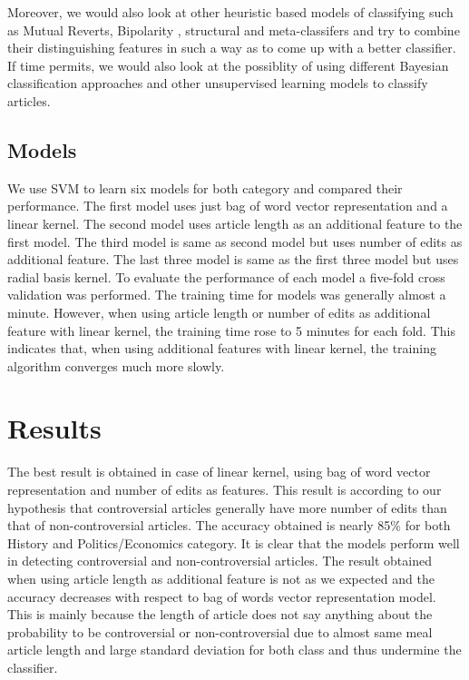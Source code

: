\documentclass[twocolumn]{article}
\newcommand{\comment}[1]{}
\begin{document}
  Moreover, we would also look at other heuristic based
models of classifying such as Mutual Reverts, Bipolarity , structural
and meta-classifers and try to combine their distinguishing features
in such a way as to come up with a better classifier. If time permits,
we would also look at the possiblity of using different Bayesian
classification approaches and other unsupervised learning models to
classify articles. 

  \subsection{Models}
  	We use SVM to learn six models for both category and compared their
performance. The first model uses just bag of word vector representation
and a linear kernel. The second model uses article length as an additional 
feature to the first model. The third model is same as second model but uses
number of edits as additional feature. The last three model is same as the
first three model but uses radial basis kernel. To evaluate the performance of
each model a five-fold cross validation was performed. The training time for
models was generally almost a minute. However, when using article length or 
number of edits as additional feature with linear kernel, the training time
rose to 5 minutes for each fold. This indicates that, when using additional
features with linear kernel, the training algorithm converges much more slowly.
 \comment{

 Use the following format for figures:

 \begin{figure}[t]
         \centering
         \texttt{[image: figure\_file]}
         \caption{This figure explains this.}
         \label{fig:block}
 \end{figure}

 And refer as Figure \ref{fig:block}.

 }
 \section{Results}

 The best result is obtained in case of linear kernel, using bag of word
 vector representation and number of edits as features. This result is 
 according to our hypothesis that controversial articles generally have 
 more number of edits than that of non-controversial articles. The accuracy 
 obtained is nearly 85\% for both History and Politics/Economics category.
 It is clear that the models perform well in detecting controversial and 
 non-controversial articles. The result obtained when using article length
 as additional feature is not as we expected and the accuracy decreases with
 respect to bag of words vector representation model. This is mainly because
 the length of article does not say anything about the probability to be 
 controversial or non-controversial due to almost same meal article length 
 and large standard deviation for both class and thus undermine the classifier.
 
\end{document}
